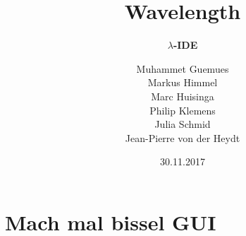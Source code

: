 \documentclass[10pt]{beamer}
\title[] %
{ %
      \textbf{Wavelength}
}
\subtitle[$\lambda$-IDE]
{
      \textbf{$\lambda$-IDE}
}
\author[wavelength]
{      Muhammet Guemues \\
       Markus Himmel \\
       Marc Huisinga \\
       Philip Klemens \\ 
       Julia Schmid \\  
       Jean-Pierre von der Heydt \\     
}
\institute[]
{
      
  
}
\date{30.11.2017}
\begin{document}

{
\begin{frame}
\maketitle
\end{frame}
}



\section{Mach mal bissel GUI}
\end{document}
